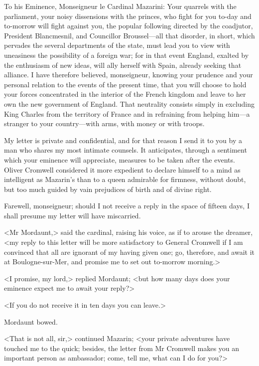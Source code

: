 \begin{mail}{}{To his Eminence, Monseigneur le Cardinal Mazarini:}
Your quarrels with the parliament, your noisy dissensions with the princes, who fight for you to-day and to-morrow will fight against you, the popular following directed by the coadjutor, President Blancmesnil, and Councillor Broussel—all that disorder, in short, which pervades the several departments of the state, must lead you to view with uneasiness the possibility of a foreign war; for in that event England, exalted by the enthusiasm of new ideas, will ally herself with Spain, already seeking that alliance. I have therefore believed, monseigneur, knowing your prudence and your personal relation to the events of the present time, that you will choose to hold your forces concentrated in the interior of the French kingdom and leave to her own the new government of England. That neutrality consists simply in excluding King Charles from the territory of France and in refraining from helping him—a stranger to your country—with arms, with money or with troops.

My letter is private and confidential, and for that reason I send it to you by a man who shares my most intimate counsels. It anticipates, through a sentiment which your eminence will appreciate, measures to be taken after the events. Oliver Cromwell considered it more expedient to declare himself to a mind as intelligent as Mazarin's than to a queen admirable for firmness, without doubt, but too much guided by vain prejudices of birth and of divine right.

Farewell, monseigneur; should I not receive a reply in the space of fifteen days, I shall presume my letter will have miscarried.

\end{mail}

<Mr Mordaunt,> said the cardinal, raising his voice, as if to arouse the dreamer, <my reply to this letter will be more satisfactory to General Cromwell if I am convinced that all are ignorant of my having given one; go, therefore, and await it at Boulogne-sur-Mer, and promise me to set out to-morrow morning.>

<I promise, my lord,> replied Mordaunt; <but how many days does your eminence expect me to await your reply?>

<If you do not receive it in ten days you can leave.>

Mordaunt bowed.

<That is not all, sir,> continued Mazarin; <your private adventures have touched me to the quick; besides, the letter from Mr Cromwell makes you an important person as ambassador; come, tell me, what can I do for you?>

